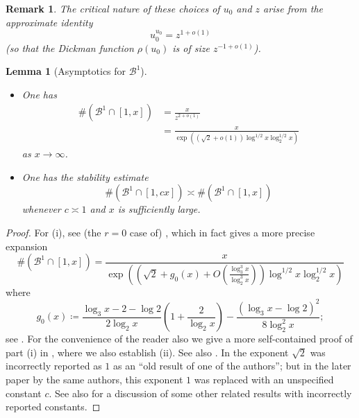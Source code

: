 \documentclass[12pt]{amsart}
\newtheorem{lemma}[theorem]{Lemma}
\newtheorem{remark}[theorem]{Remark}
\begin{document}
\begin{remark}
The critical nature of these choices of $u_0$ and $z$ arise from the approximate identity
\begin{equation}\label{upow}
    u_0^{u_0} = z^{1+o(1)}
\end{equation}
(so that the Dickman function $\rho(u_0)$ is of size $z^{-1+o(1)}$).
\end{remark}

\begin{lemma}[Asymptotics for ${\mathcal B}^1$]\label{b-asym}\
    \begin{itemize}
        \item[(i)]      One has
\begin{align*}
\#({\mathcal B}^1 \cap [1,x]) &= \frac{x}{z^{2+o(1)}}\\
&= \frac{x}{\exp\left( (\sqrt{2}+o(1)) \log^{1/2} x \log^{1/2}_2 x\right)}
\end{align*}
as $x \to \infty$.
        \item[(ii)] One has the stability estimate
\begin{equation}\label{bo}
\#({\mathcal B}^1 \cap [1,cx]) \asymp \#({\mathcal B}^1 \cap [1,x])
\end{equation}
whenever $c \asymp 1$ and $x$ is sufficiently large.
    \end{itemize}
\end{lemma}

\begin{proof} For (i), see (the $r=0$ case of) \cite[(1.3), (1.7)]{ivic}, which in fact gives a more precise expansion
\begin{equation}\label{g0}
\#({\mathcal B}^1 \cap [1,x])  = \frac{x}{\exp\left( \left(\sqrt{2}+g_0(x) + O\left(\frac{\log_3^3 x}{\log_2^3 x}\right)\right) \log^{1/2} x \log^{1/2}_2 x\right)}
\end{equation}
where
$$ g_0(x) \coloneqq  \frac{\log_3 x - 2 -\log 2}{2 \log_2 x} \left( 1 + \frac{2}{\log_2 x} \right) - \frac{(\log_3 x - \log 2)^2}{8 \log_2^2 x};$$
see . For the convenience of the reader also we give a more self-contained proof of part (i) in \Cref{notation-sec}, where we also establish (ii). See also \Cref{fig-bad}.
In \cite[p. 345]{erdos-graham} the exponent $\sqrt{2}$ was incorrectly reported as $1$ as an ``old result of one of the authors''; but in the later paper \cite[p. 73]{eg} by the same authors, this exponent $1$ was replaced with an unspecified constant $c$. See also \cite{ivic-2} for a discussion of some other related results with incorrectly reported constants.
\end{proof}
\end{document}
